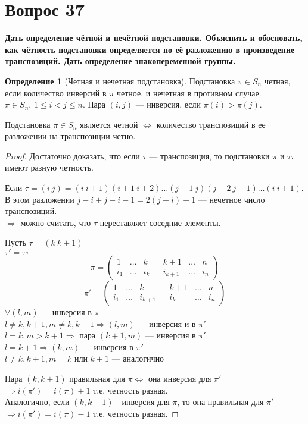 \documentclass[a4paper]{article}
\theoremstyle{definition}
\newtheorem{definition}{Определение}
\theoremstyle{plain}
\begin{document}
\section{Вопрос 37}
\textbf{Дать определение чётной и нечётной подстановки.
Объяснить и обосновать, как чётность подстановки определяется по её разложению в произведение транспозиций.
Дать определение знакопеременной группы.}

\begin{definition}[Четная и нечетная подстановка]
  Подстановка $\pi \in S_{n}$ четная, если количество инверсий в $\pi$ четное, и нечетная в противном случае.\\
  $\pi \in S_{n}$, $1 \leq i < j \leq n$.
  Пара $(i, j)$ --- инверсия, если $\pi(i) > \pi(j)$.
\end{definition}

Подстановка $\pi \in S_{n}$ является четной $\Leftrightarrow$ количество транспозиций в ее разложении на транспозиции четно.

\begin{proof}
  Достаточно доказать, что если $\tau$ --- транспозиция, то подстановки $\pi$ и $\tau \pi$ имеют разную четность.

  Если $\tau = (i\ j) = (i\ i+1)(i+1\ i+2)\dots(j-1\ j)(j-2\ j-1)\ldots(i\ i+1)$.
  В этом разложении $j - i + j - i - 1 = 2 (j - i) - 1$ --- нечетное число транспозиций.\\
  $\Rightarrow$ можно считать, что $\tau$ переставляет соседние элементы.

  Пусть $\tau = (k\ k+1)$\\
  $\tau' = \tau\pi$
  \begin{equation*}
    \pi =
    \begin{pmatrix}
      1 & \ldots & k & & k + 1 & \ldots & n\\
      i_{1} & \ldots & i_{k} & & i_{k+1} & \ldots & i_{n}
    \end{pmatrix}
  \end{equation*}
  \begin{equation*}
    \pi' =
    \begin{pmatrix}
      1 & \ldots & k & & k + 1 & \ldots & n\\
      i_{1} & \ldots & i_{k+1} & & i_{k} & \ldots & i_{n}
    \end{pmatrix}
  \end{equation*}
  $\forall (l, m)$ --- инверсия в $\pi$\\
  $l \neq k, k+1, m \neq k, k+1 \Rightarrow (l, m)$ --- инверсия и в $\pi'$\\
  $l = k, m > k+1 \Rightarrow$ пара $(k+1, m)$ --- инверсия в $\pi'$\\
  $l = k+1 \Rightarrow (k, m)$ --- инверсия в $\pi'$\\
  $l \neq k,k+1, m = k$ или $k+1$ --- аналогично

  Пара $(k, k+1)$ правильная для $\pi \Leftrightarrow$ она инверсия для $\pi'$ $\Rightarrow i(\pi') = i(\pi) + 1$ т.е. четность разная.\\
  Аналогично, если $(k, k+1)$ - инверсия для $\pi$, то она правильная для $\pi'$ $\Rightarrow i(\pi') = i(\pi) - 1$ т.е. четность разная.
\end{proof}
\end{document}
